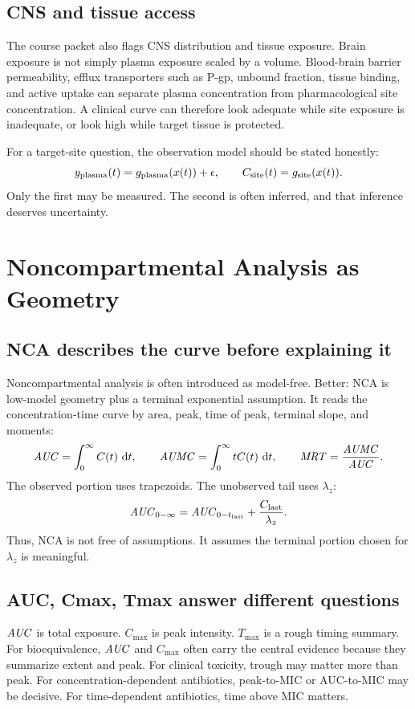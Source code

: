 \documentclass[a4paper]{article}
\newcommand{\pkAUC}{\pksym{AUC}}
\newcommand{\pkAUMC}{\pksym{AUMC}}
\newcommand{\pkMRT}{\pksym{MRT}}
\newcommand{\pkCmax}{C_{\max}}
\newcommand{\pkTmax}{T_{\max}}
\begin{document}
\subsection{CNS and tissue access}

The course packet also flags CNS distribution and tissue exposure. Brain exposure is not simply plasma exposure scaled by a volume. Blood-brain barrier permeability, efflux transporters such as P-gp, unbound fraction, tissue binding, and active uptake can separate plasma concentration from pharmacological site concentration. A clinical curve can therefore look adequate while site exposure is inadequate, or look high while target tissue is protected.

For a target-site question, the observation model should be stated honestly:
\[
  y_{\mathrm{plasma}}(t)=g_{\mathrm{plasma}}(x(t))+\epsilon,
  \qquad
  C_{\mathrm{site}}(t)=g_{\mathrm{site}}(x(t)).
\]
Only the first may be measured. The second is often inferred, and that inference deserves uncertainty.

\section{Noncompartmental Analysis as Geometry}

\subsection{NCA describes the curve before explaining it}

Noncompartmental analysis is often introduced as model-free. Better: NCA is low-model geometry plus a terminal exponential assumption. It reads the concentration-time curve by area, peak, time of peak, terminal slope, and moments:
\[
  \pkAUC=\int_0^\infty C(t)\,\dd t,
  \qquad
  \pkAUMC=\int_0^\infty tC(t)\,\dd t,
  \qquad
  \pkMRT=\frac{\pkAUMC}{\pkAUC}.
\]
The observed portion uses trapezoids. The unobserved tail uses \(\lambda_z\):
\[
  \pkAUC_{0-\infty}
  =
  \pkAUC_{0-t_{\pklab{last}}}
  +
  \frac{C_{\pklab{last}}}{\lambda_z}.
\]
Thus, NCA is not free of assumptions. It assumes the terminal portion chosen for \(\lambda_z\) is meaningful.

\figureAucTrapezoids

\subsection{AUC, Cmax, Tmax answer different questions}

\(\pkAUC\) is total exposure. \(\pkCmax\) is peak intensity. \(\pkTmax\) is a rough timing summary. For bioequivalence, \(\pkAUC\) and \(\pkCmax\) often carry the central evidence because they summarize extent and peak. For clinical toxicity, trough may matter more than peak. For concentration-dependent antibiotics, peak-to-MIC or AUC-to-MIC may be decisive. For time-dependent antibiotics, time above MIC matters.
\end{document}
